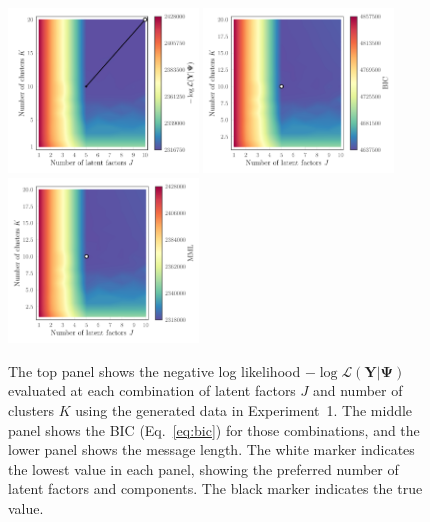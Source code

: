 \documentclass[twocolumn]{aastex62}
\newcommand{\vect}[1]{\boldsymbol{\mathbf{#1}}}
\renewcommand{\vec}[1]{\vect{#1}}
\newcommand{\data}{\textbf{Y}}
\newcommand{\NumLatentFactors}{J}
\newcommand{\NumComponents}{K}
\begin{document}
\begin{figure}
	\includegraphics[width=0.45\textwidth]{experiments/exp1-gridsearch-ll-contours.pdf}
	\includegraphics[width=0.45\textwidth]{experiments/exp1-gridsearch-bic-contours.pdf}
	\includegraphics[width=0.45\textwidth]{experiments/exp1-gridsearch-mml-contours.pdf}
    \caption{The top panel shows the negative log likelihood 
			 $-\log{\mathcal{L}\left(\data|\vec\Psi\right)}$ 
			 evaluated at each combination of latent factors 
			 $\NumLatentFactors$ and number of clusters 
			 $\NumComponents$ using the generated data in
			 Experiment~1.  The middle panel shows 
			 the BIC (Eq.~\ref{eq:bic}) for those 
			 combinations, and the lower panel shows the 
			 message length. The white marker indicates the
			 lowest value in each panel, showing the
			 preferred number of latent factors and components.
			 The black marker indicates the true value.}
    \label{fig:experiment-1-gridsearch}
\end{figure}
\end{document}
